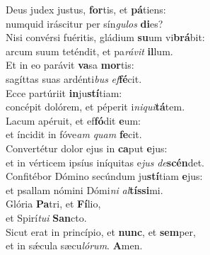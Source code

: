 \evenverse Deus judex justus, \textbf{for}tis, et \textbf{pá}tiens:~\*\\
\evenverse numquid iráscitur per sín\textit{gu}\textit{los} \textbf{di}es?\\
\oddverse Nisi convérsi fuéritis, gládium \textbf{su}um vi\textbf{brá}bit:~\*\\
\oddverse arcum suum teténdit, et pa\textit{rá}\textit{vit} \textbf{il}lum.\\
\evenverse Et in eo parávit \textbf{va}sa \textbf{mor}tis:~\*\\
\evenverse sagíttas suas ardénti\textit{bus} \textit{ef}\textbf{fé}cit.\\
\oddverse Ecce partúriit \textbf{in}ju\textbf{stí}tiam:~\*\\
\oddverse concépit dolórem, et péperit i\textit{ni}\textit{qui}\textbf{tá}tem.\\
\evenverse Lacum apéruit, et ef\textbf{fó}dit \textbf{e}um:~\*\\
\evenverse et íncidit in fóve\textit{am} \textit{quam} \textbf{fe}cit.\\
\oddverse Convertétur dolor ejus in \textbf{ca}put \textbf{e}jus:~\*\\
\oddverse et in vérticem ipsíus iníquitas e\textit{jus} \textit{de}\textbf{scén}det.\\
\evenverse Confitébor Dómino secúndum ju\textbf{stí}tiam \textbf{e}jus:~\*\\
\evenverse et psallam nómini Dómi\textit{ni} \textit{al}\textbf{tís}\textbf{si}mi.\\
\oddverse Glória \textbf{Pa}tri, et \textbf{Fí}lio,~\*\\
\oddverse et Spirí\textit{tu}\textit{i} \textbf{San}cto.\\
\evenverse Sicut erat in princípio, et \textbf{nunc}, et \textbf{sem}per,~\*\\
\evenverse et in sǽcula sæcu\textit{ló}\textit{rum}. \textbf{A}men.\\
